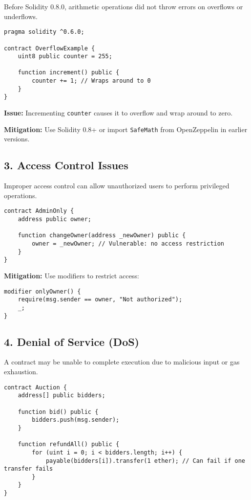 Before Solidity 0.8.0, arithmetic operations did not throw errors on overflows or underflows.

\begin{lstlisting}[language=Solidity, caption=Integer overflow example, label={lst:overflow}]
pragma solidity ^0.6.0;

contract OverflowExample {
    uint8 public counter = 255;

    function increment() public {
        counter += 1; // Wraps around to 0
    }
}
\end{lstlisting}

\textbf{Issue:} Incrementing \texttt{counter} causes it to overflow and wrap around to zero.

\textbf{Mitigation:} Use Solidity 0.8+ or import \texttt{SafeMath} from OpenZeppelin in earlier versions.

\subsection*{3. Access Control Issues}

Improper access control can allow unauthorized users to perform privileged operations.

\begin{lstlisting}[language=Solidity, caption={Access control flaw}, label={lst:access_control}, captionpos=b]
contract AdminOnly {
    address public owner;

    function changeOwner(address _newOwner) public {
        owner = _newOwner; // Vulnerable: no access restriction
    }
}
\end{lstlisting}

\textbf{Mitigation:} Use modifiers to restrict access:

\begin{lstlisting}[language=Solidity]
modifier onlyOwner() {
    require(msg.sender == owner, "Not authorized");
    _;
}
\end{lstlisting}

\subsection*{4. Denial of Service (DoS)}

A contract may be unable to complete execution due to malicious input or gas exhaustion.

\begin{lstlisting}[language=Solidity, caption={DoS via expensive loop}, label={lst:dos_loop}, captionpos=b]
contract Auction {
    address[] public bidders;

    function bid() public {
        bidders.push(msg.sender);
    }

    function refundAll() public {
        for (uint i = 0; i < bidders.length; i++) {
            payable(bidders[i]).transfer(1 ether); // Can fail if one transfer fails
        }
    }
}
\end{lstlisting}

